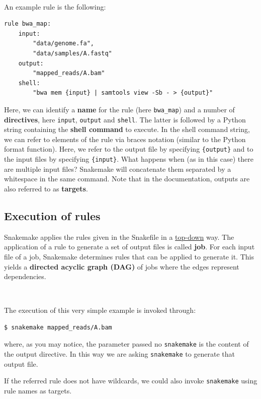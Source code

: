 \documentclass[10pt]{article}
\begin{document}
\

An example rule is the following:

\begin{lstlisting}[style=mypython]
rule bwa_map:
    input:
        "data/genome.fa",
        "data/samples/A.fastq"
    output:
        "mapped_reads/A.bam"
    shell:
        "bwa mem {input} | samtools view -Sb - > {output}"
\end{lstlisting}

Here, we can identify a \textbf{name} for the rule (here \texttt{bwa\_map}) and a number of \textbf{directives}, here \texttt{input}, \texttt{output} and \texttt{shell}. The latter is followed by a Python string containing the \textbf{shell command} to execute. In the shell command string, we can refer to elements of the rule via braces notation (similar to the Python format function). Here, we refer to the output file by specifying \texttt{\{output\}} and to the input files by specifying \texttt{\{input\}}. What happens when (as in this case) there are multiple input files? Snakemake will concatenate them separated by a whitespace in the same command. Note that in the documentation, outputs are also referred to as \textbf{targets}.

\subsection{Execution of rules}

Snakemake applies the rules given in the Snakefile in a \ul{top-down} way. The application of a rule to generate a set of output files is called \textbf{job}. For each input file of a job, Snakemake determines rules that can be applied to generate it. This yields a \textbf{directed acyclic graph (DAG)} of jobs where the edges represent dependencies.

\ 

The execution of this very simple example is invoked through:

\begin{lstlisting}[style=mybash]
$ snakemake mapped_reads/A.bam
\end{lstlisting}

where, as you may notice, the parameter passed no \texttt{snakemake} is the content of the output directive. In this way we are asking \texttt{snakemake} to generate that output file.

If the referred rule does not have wildcards, we could also invoke \texttt{snakemake} using rule names as targets.
\end{document}
